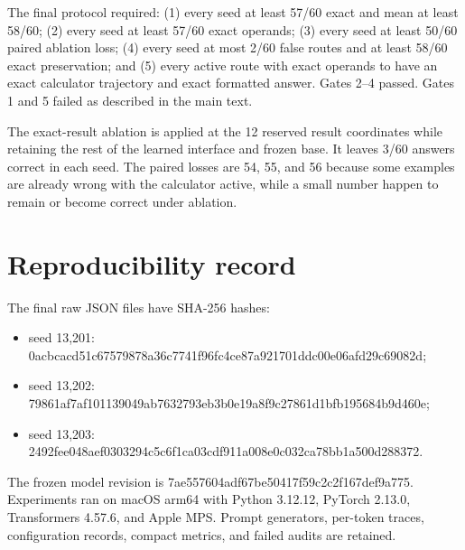 \documentclass{article}
\begin{document}
The final protocol required: (1) every seed at least 57/60 exact and mean at
least 58/60; (2) every seed at least 57/60 exact operands; (3) every seed at
least 50/60 paired ablation loss; (4) every seed at most 2/60 false routes and
at least 58/60 exact preservation; and (5) every active route with exact
operands to have an exact calculator trajectory and exact formatted answer.
Gates 2--4 passed. Gates 1 and 5 failed as described in the main text.

The exact-result ablation is applied at the 12 reserved result coordinates
while retaining the rest of the learned interface and frozen base. It leaves
3/60 answers correct in each seed. The paired losses are 54, 55, and 56 because
some examples are already wrong with the calculator active, while a small
number happen to remain or become correct under ablation.

\section{Reproducibility record}

The final raw JSON files have SHA-256 hashes:
\begin{itemize}
\item seed 13,201:
{\footnotesize\ttfamily
0acbcacd51c67579878a36c7741f96fc4ce87a921701ddc00e06afd29c69082d};
\item seed 13,202:
{\footnotesize\ttfamily
79861af7af101139049ab7632793eb3b0e19a8f9c27861d1bfb195684b9d460e};
\item seed 13,203:
{\footnotesize\ttfamily
2492fee048aef0303294c5c6f1ca03cdf911a008e0c032ca78bb1a500d288372}.
\end{itemize}
The frozen model revision is
{\footnotesize\ttfamily
7ae557604adf67be50417f59c2c2f167def9a775}.
Experiments ran on macOS arm64 with Python 3.12.12, PyTorch 2.13.0,
Transformers 4.57.6, and Apple MPS. Prompt generators, per-token traces,
configuration records, compact metrics, and failed audits are retained.
\end{document}
